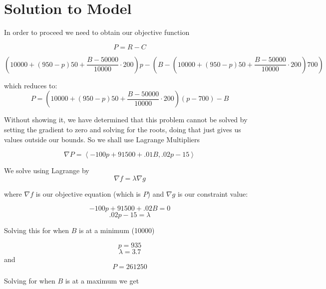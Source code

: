 \documentclass{report}
\begin{document}

\section{Solution to Model}
In order to proceed we need to obtain our objective function



$$P=R-C$$

$$\left(10000+(950-p)50+\frac{B-50000}{10000}\cdot200\right)p-\left(B-\left(10000+(950-p)50+\frac{B-50000}{10000}\cdot200\right)700\right)$$

which reduces to: $$P=\left(10000+(950-p)50+\frac{B-50000}{10000}\cdot 200\right)(p-700)-B$$

Without showing it, we have determined that this problem cannot be solved by setting the gradient to zero and solving for the roots, doing that just gives us values outside our bounds. So we shall use Lagrange Multipliers

$$\nabla P = \left\langle-100p+91500+.01B,.02p-15\right\rangle$$

We solve using Lagrange by $$\nabla f = \lambda \nabla g$$

where $\nabla f$ is our objective equation (which is $P$) and $\nabla g$ is our constraint value: 

$$-100p+91500+.02B = 0$$
$$.02p-15 = \lambda$$

Solving this for when $B$ is at a minimum (10000) 

$$p=935$$
$$\lambda = 3.7$$
and
$$P = 261250$$

Solving for when $B$ is at a maximum we get 
\end{document}
